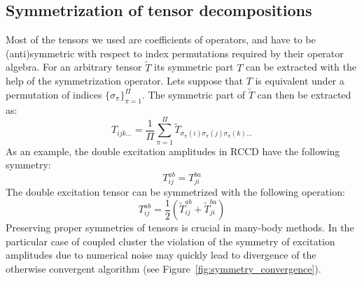 \subsection{Symmetrization of tensor decompositions
\label{sec:symmetrization}}
Most of the tensors we used are coefficients of operators, and have to be 
(anti)symmetric with respect to index permutations required by their 
operator algebra. For an arbitrary tensor $\tilde{T}$ its symmetric 
part $T$ can be extracted with the help of the symmetrization operator. 
Lets suppose that $T$ is equivalent under a permutation of indices 
$\{\sigma_{\pi}\}_{\pi=1}^{\Pi}$. The symmetric part of $\tilde{T}$ can then be 
extracted as:
%
\begin{equation}
T_{ijk\ldots} = \frac{1}{\Pi} \sum_{\pi=1}^{\Pi} 
\tilde{T}_{\sigma_{\pi}(i) \sigma_{\pi}(j) \sigma_{\pi}(k) \ldots}
\end{equation}
%
As an example, the double excitation amplitudes in 
RCCD have the following symmetry:
\begin{equation}
 T_{ij}^{ab} = T_{ji}^{ba}
\end{equation}
The double excitation tensor can be symmetrized with the following operation:
%
\begin{equation}
 T_{ij}^{ab} = \frac{1}{2} (\tilde{T}_{ij}^{ab} + \tilde{T}_{ji}^{ba})
 \label{eq:symmetrization}
\end{equation}
%
Preserving proper symmetries of tensors is crucial in many-body methods. 
In the particular case of coupled cluster the violation of the symmetry of 
excitation amplitudes due to numerical noise may quickly lead to divergence of 
the otherwise convergent algorithm (see Figure~\ref{fig:symmetry_convergence}).
%
